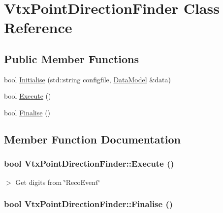 \hypertarget{classVtxPointDirectionFinder}{
\section{VtxPointDirectionFinder Class Reference}
\label{classVtxPointDirectionFinder}
}
\subsection*{Public Member Functions}
\begin{DoxyCompactItemize}
\item 
bool \hyperlink{classVtxPointDirectionFinder_aa95039075c595e8fc3d873158036ea1f}{Initialise} (std::string configfile, \hyperlink{classDataModel}{DataModel} \&data)
\item 
bool \hyperlink{classVtxPointDirectionFinder_a8db18f92b7ae99392c7615131b929676}{Execute} ()
\item 
bool \hyperlink{classVtxPointDirectionFinder_a4dd5a07dc9b778c3bf633ba21f75792d}{Finalise} ()
\end{DoxyCompactItemize}


\subsection{Member Function Documentation}
\hypertarget{classVtxPointDirectionFinder_a8db18f92b7ae99392c7615131b929676}{
\subsubsection[{Execute}]{\setlength{\rightskip}{0pt plus 5cm}bool VtxPointDirectionFinder::Execute ()}}
\label{classVtxPointDirectionFinder_a8db18f92b7ae99392c7615131b929676}


$>$ Get digits from \char`\"{}RecoEvent\char`\"{} \hypertarget{classVtxPointDirectionFinder_a4dd5a07dc9b778c3bf633ba21f75792d}{
\subsubsection[{Finalise}]{\setlength{\rightskip}{0pt plus 5cm}bool VtxPointDirectionFinder::Finalise ()}}
\label{classVtxPointDirectionFinder_a4dd5a07dc9b778c3bf633ba21f75792d}


